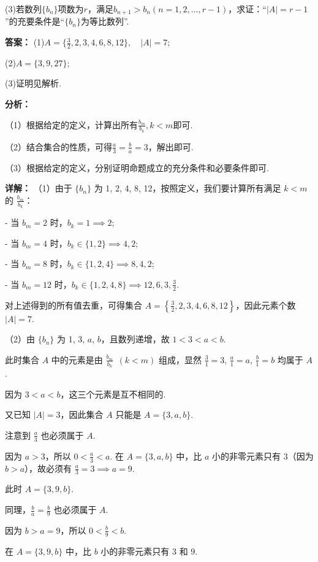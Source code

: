 \documentclass[11pt,a4paper]{ctexart}
\begin{document}
(3)若数列\(\{b_n\}\)项数为\(r\)，满足\(b_{n + 1} > b_n(n = 1,2,\dots ,r - 1)\)，求证：``\(|A| = r - 1\)''的充要条件是``\(\{b_n\}\)为等比数列''.

\textbf{答案：}
(1)\(A=\{\frac{3}{2},2,3,4,6,8,12\},\quad|A|=7;\)

(2)\(A=\{3,9,27\}\);

(3)证明见解析.

\textbf{分析：}

（1）根据给定的定义，计算出所有\(\frac{b_{m}}{b_{k}}, k < m\)即可.

（2）结合集合的性质，可得\(\frac{a}{3}=\frac{b}{a}=3\)，解出即可.

（3）根据给定的定义，分别证明命题成立的充分条件和必要条件即可.

\textbf{详解：}
（1）由于 \(\{b_n\}\) 为 1, 2, 4, 8, 12，按照定义，我们要计算所有满足 \(k < m\) 的 \(\frac{b_m}{b_k}\)：

- 当 \(b_m = 2\) 时，\(b_k = 1 \implies 2\);

- 当 \(b_m = 4\) 时，\(b_k \in \{1, 2\} \implies 4, 2\);

- 当 \(b_m = 8\) 时，\(b_k \in \{1, 2, 4\} \implies 8, 4, 2\);

- 当 \(b_m = 12\) 时，\(b_k \in \{1, 2, 4, 8\} \implies 12, 6, 3, \frac{3}{2}\).

对上述得到的所有值去重，可得集合 \(A = \left\{\frac{3}{2}, 2, 3, 4, 6, 8, 12\right\}\)，因此元素个数 \(|A| = 7\).

（2）由 \(\{b_n\}\) 为 1, 3, \(a\), \(b\)，且数列递增，故 \(1 < 3 < a < b\).

此时集合 $A$ 中的元素是由 \(\frac{b_m}{b_k}\ \ (k < m)\) 组成，显然 \(\frac{3}{1} = 3\), \(\frac{a}{1} = a\), \(\frac{b}{1} = b\) 均属于 $A$.

因为 \(3 < a < b\)，这三个元素是互不相同的.

又已知 \(|A| = 3\)，因此集合 $A$ 只能是 \(A = \{3, a, b\}\).

注意到 \(\frac{a}{3}\) 也必须属于 $A$.

因为 \(a > 3\)，所以 \(0 < \frac{a}{3} < a\). 在 \(A = \{3, a, b\}\) 中，比 \(a\) 小的非零元素只有 \(3\)（因为 \(b > a\)），故必须有 \(\frac{a}{3} = 3 \implies a = 9\).

此时 \(A = \{3, 9, b\}\).

同理，\(\frac{b}{a} = \frac{b}{9}\) 也必须属于 $A$.

因为 \(b > a = 9\)，所以 \(0 < \frac{b}{9} < b\).

在 \(A = \{3, 9, b\}\) 中，比 \(b\) 小的非零元素只有 \(3\) 和 \(9\).
\end{document}
